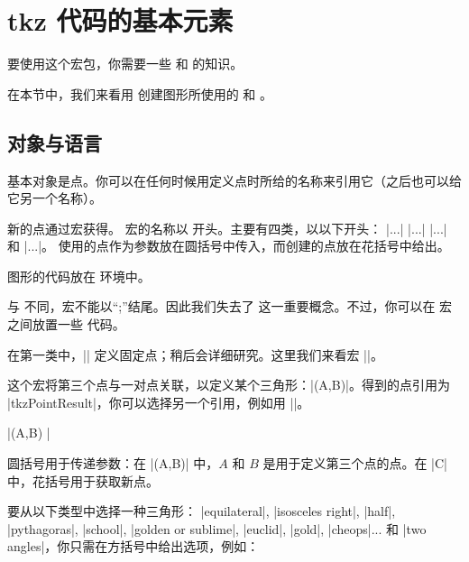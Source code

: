 \section{tkz 代码的基本元素}

要使用这个宏包，你需要一些 \LATEX 和 \TIKZ 的知识。

在本节中，我们来看用 \tkzname{\tkznameofpack} 创建图形所使用的  和 。

\subsection{对象与语言}

 基本对象是点。你可以在任何时候用定义点时所给的名称来引用它（之后也可以给它另一个名称）。

新的点通过宏获得。\tkzname{\tkznameofpack} 宏的名称以  开头。主要有四类，以以下开头：
|\tkzDef...| |\tkzDraw...| |\tkzMark...| 和 |\tkzLabel...|。
使用的点作为参数放在圆括号中传入，而创建的点放在花括号中给出。

图形的代码放在  环境中。


与 \TIKZ 不同，宏不能以“;”结尾。因此我们失去了  这一重要概念。不过，你可以在 \tkzname{\tkznameofpack} 宏之间放置一些 \TIKZ 代码。


在第一类中，|\tkzDefPoint| 定义固定点；稍后会详细研究。这里我们来看宏 |\tkzDefTriangle|。

这个宏将第三个点与一对点关联，以定义某个三角形：|\tkzDefTriangle(A,B)|。得到的点引用为 |tkzPointResult|，你可以选择另一个引用，例如用 ||。

|\tkzDefTriangle[euclid](A,B) |

圆括号用于传递参数：在 |(A,B)| 中，$A$ 和 $B$ 是用于定义第三个点的点。在 |{C}| 中，花括号用于获取新点。

要从以下类型中选择一种三角形：
  |equilateral|,  |isosceles right|, |half|, |pythagoras|, |school|, |golden or sublime|, |euclid|, |gold|, |cheops|...
 和 |two angles|，你只需在方括号中给出选项，例如：
 
\begin{minipage}{0.5\textwidth}
\end{minipage}
\begin{minipage}{0.5\textwidth}
  \begin{tkzexample}
  \end{tkzexample}
\end{minipage}

